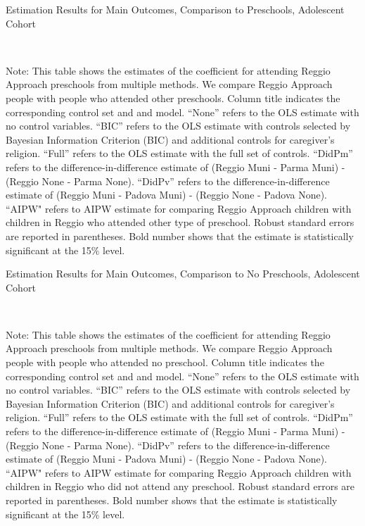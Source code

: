 \begin{landscape}
\begin{table}[H]
\end{table}





\begin{table}[H] \caption{Estimation Results for Main Outcomes, Comparison to Preschools, Adolescent Cohort} \label{ols-M-adol-reg-pres}
\scalebox{0.9}{}
\vspace{1ex} \\
\footnotesize\raggedright{Note: This table shows the estimates of the coefficient for attending Reggio Approach preschools from multiple methods. We compare Reggio Approach people with people who attended other preschools. Column title indicates the corresponding control set and and model. ``None'' refers to the OLS estimate with no control variables. ``BIC'' refers to the OLS estimate with controls selected by Bayesian Information Criterion (BIC) and additional controls for caregiver's religion. ``Full'' refers to the OLS estimate with the full set of controls. ``DidPm'' refers to the difference-in-difference estimate of (Reggio Muni - Parma Muni) - (Reggio None - Parma None). ``DidPv'' refers to the difference-in-difference estimate of (Reggio Muni - Padova Muni) - (Reggio None - Padova None). ``AIPW" refers to AIPW estimate for comparing Reggio Approach children with children in Reggio who attended other type of preschool. Robust standard errors are reported in parentheses. Bold number shows that the estimate is statistically significant at the 15\% level.}
\end{table}

\begin{table}[H] \caption{Estimation Results for Main Outcomes, Comparison to No Preschools, Adolescent Cohort} \label{ols-M-adol-reg-nopres}
\scalebox{0.9}{}
\vspace{1ex} \\
\footnotesize\raggedright{Note: This table shows the estimates of the coefficient for attending Reggio Approach preschools from multiple methods. We compare Reggio Approach people with people who attended no preschool. Column title indicates the corresponding control set and and model. ``None'' refers to the OLS estimate with no control variables. ``BIC'' refers to the OLS estimate with controls selected by Bayesian Information Criterion (BIC) and additional controls for caregiver's religion. ``Full'' refers to the OLS estimate with the full set of controls. ``DidPm'' refers to the difference-in-difference estimate of (Reggio Muni - Parma Muni) - (Reggio None - Parma None). ``DidPv'' refers to the difference-in-difference estimate of (Reggio Muni - Padova Muni) - (Reggio None - Padova None).  ``AIPW" refers to AIPW estimate for comparing Reggio Approach children with children in Reggio who did not attend any preschool. Robust standard errors are reported in parentheses. Bold number shows that the estimate is statistically significant at the 15\% level.}
\end{table}





\end{landscape}
